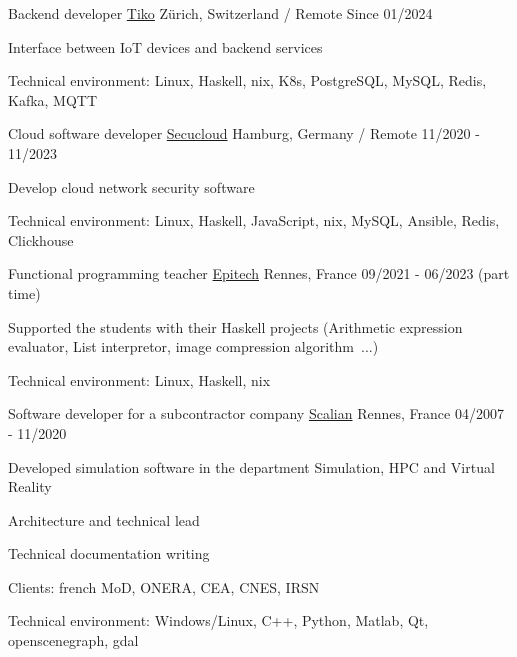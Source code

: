 \begin{cventries}
  \cventry
    {Backend developer}
    {\href{https://www.linkedin.com/company/secucloud/}{Tiko}}
    {Zürich, Switzerland / Remote}
    {Since 01/2024}
    {
      \begin{cvitems}
        \item {Interface between IoT devices and backend services}
        \item {Technical environment: Linux, Haskell, nix, K8s, PostgreSQL, 
            MySQL, Redis, Kafka, MQTT}
      \end{cvitems}
    }

  \cventry
    {Cloud software developer}
    {\href{https://www.linkedin.com/company/secucloud/}{Secucloud}}
    {Hamburg, Germany / Remote}
    {11/2020 - 11/2023}
    {
      \begin{cvitems}
        \item {Develop cloud network security software}
        \item {Technical environment: Linux, Haskell, JavaScript, nix,
            MySQL, Ansible, Redis, Clickhouse}
      \end{cvitems}
    }

  \cventry
    {Functional programming teacher}
    {\href{https://www.epitech.eu/}{Epitech}}
    {Rennes, France}
    {09/2021 - 06/2023 (part time)}
    {
      \begin{cvitems}
          \item {Supported the students with their Haskell projects
              (Arithmetic expression evaluator, List interpretor, image
              compression algorithm~...)}
          \item {Technical environment: Linux, Haskell, nix}
      \end{cvitems}
    }

  \cventry
    {Software developer for a subcontractor company}
    {\href{https://www.scalian.com/}{Scalian}}
    {Rennes, France}
    {04/2007 - 11/2020}
    {
      \begin{cvitems}
        \item {Developed simulation software in the department Simulation, HPC
            and Virtual Reality}
        \item {Architecture and technical lead}
        \item {Technical documentation writing}
        \item {Clients: french MoD, ONERA, CEA, CNES, IRSN}
        \item {Technical environment: Windows/Linux, C++, Python, Matlab, Qt,
            openscenegraph, gdal}
      \end{cvitems}
    }


\end{cventries}
